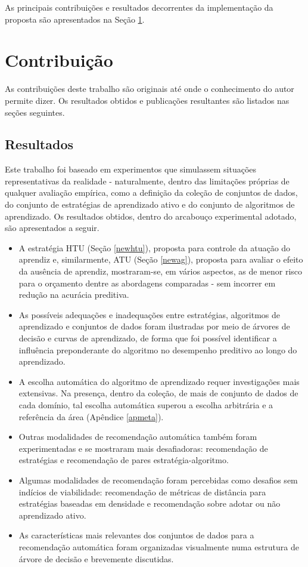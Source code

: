 As principais contribuições e resultados decorrentes da implementação da proposta são apresentados na Seção \ref{contribuicao}.

\section{Contribuição}\label{contribuicao}
As contribuições deste trabalho são originais até onde o conhecimento do autor permite dizer.
Os resultados obtidos e publicações resultantes são listados nas seções seguintes.

\subsection{Resultados}\label{introres}
Este trabalho foi baseado em experimentos que simulassem situações representativas da realidade - naturalmente, dentro das limitações próprias de qualquer avaliação empírica, como a definição da coleção de conjuntos de dados, do conjunto de estratégias de aprendizado ativo e do conjunto de algoritmos de aprendizado.
Os resultados obtidos, dentro do arcabouço experimental adotado, são apresentados a seguir.
\begin{itemize}
	\item A estratégia HTU (Seção \ref{newhtu}), proposta para controle da atuação do aprendiz e, similarmente, ATU (Seção \ref{newag}), proposta para avaliar o efeito da ausência de aprendiz, mostraram-se, em vários aspectos, as de menor risco para o orçamento dentre as abordagens comparadas - sem incorrer em redução na acurácia preditiva.

	\item As possíveis adequações e inadequações entre estratégias, algoritmos de aprendizado e conjuntos de dados foram ilustradas por meio de árvores de decisão e curvas de aprendizado, de forma que foi possível identificar a influência preponderante do algoritmo no desempenho preditivo ao longo do aprendizado.

	\item A escolha automática do algoritmo de aprendizado requer investigações mais extensivas. Na presença, dentro da coleção, de mais de conjunto de dados de cada domínio, tal escolha automática superou a escolha arbitrária e a referência da área (Apêndice \ref{apmeta}).
	
	\item Outras modalidades de recomendação automática também foram experimentadas e se mostraram mais desafiadoras: recomendação de estratégias e recomendação de pares estratégia-algoritmo.
	
	\item Algumas modalidades de recomendação foram percebidas como desafios sem indícios de viabilidade: recomendação de métricas de distância para estratégias baseadas em densidade e recomendação sobre adotar ou não aprendizado ativo.
	
	\item As características mais relevantes dos conjuntos de dados para a recomendação automática foram organizadas visualmente numa estrutura de árvore de decisão e brevemente discutidas.
\end{itemize}

